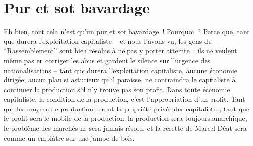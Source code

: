 \documentclass[french,twoside]{book} %
\begin{document}
\section[{Pur et sot bavardage}]{Pur et sot bavardage}
\noindent Eh bien, tout cela n’est qu’un pur et sot bavardage ! Pourquoi ? Parce que, tant que durera l’exploitation capitaliste – et nous l’avons vu, les gens du “Rassemblement” sont bien résolus à ne pas y porter atteinte ; ils ne veulent même pas en corriger les abus et gardent le silence sur l’urgence des nationalisations – tant que durera l’exploitation capitaliste, aucune économie dirigée, aucun plan si astucieux qu’il paraisse, ne contraindra le capitaliste à continuer la production s’il n’y trouve pas son profit. Dans toute économie capitaliste, la condition de la production, c’est l’appropriation d’un profit. Tant que les moyens de production seront la propriété privée des capitalistes, tant que le profit sera le mobile de la production, la production sera toujours anarchique, le problème des marchés ne sera jamais résolu, et la recette de Marcel Déat sera comme un emplâtre sur une jambe de bois.
\end{document}

